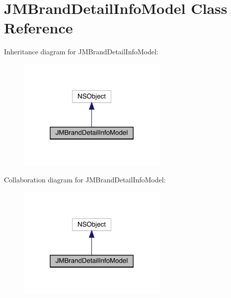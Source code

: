 \hypertarget{interface_j_m_brand_detail_info_model}{}\section{J\+M\+Brand\+Detail\+Info\+Model Class Reference}
\label{interface_j_m_brand_detail_info_model}


Inheritance diagram for J\+M\+Brand\+Detail\+Info\+Model\+:\nopagebreak
\begin{figure}[H]
\begin{center}
\leavevmode
\includegraphics[width=205pt]{interface_j_m_brand_detail_info_model__inherit__graph}
\end{center}
\end{figure}


Collaboration diagram for J\+M\+Brand\+Detail\+Info\+Model\+:\nopagebreak
\begin{figure}[H]
\begin{center}
\leavevmode
\includegraphics[width=205pt]{interface_j_m_brand_detail_info_model__coll__graph}
\end{center}
\end{figure}
